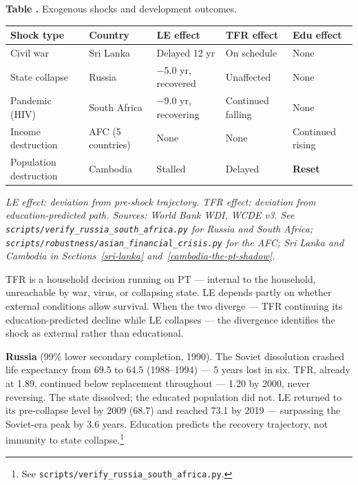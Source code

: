 \documentclass[12pt,letterpaper]{article}
\begin{document}
\label{tab:shock}\textbf{Table \thetable.} Exogenous shocks and development outcomes.

{\small
\begin{longtable}[]{@{}
  >{\raggedright\arraybackslash}p{}
  >{\raggedright\arraybackslash}p{}
  >{\raggedright\arraybackslash}p{}
  >{\raggedright\arraybackslash}p{}
  >{\raggedright\arraybackslash}p{}@{}}
\toprule
Shock type & Country & LE effect & TFR effect & Edu effect \\
\midrule
\endhead
Civil war & Sri Lanka & Delayed 12 yr & On schedule & None \\
State collapse & Russia & $-$5.0 yr, recovered & Unaffected & None \\
Pandemic (HIV) & South Africa & $-$9.0 yr, recovering & Continued falling & None \\
Income destruction & AFC (5 countries) & None & None & Continued rising \\
Population destruction & Cambodia & Stalled & Delayed & \textbf{Reset} \\
\bottomrule
\end{longtable}
}

\emph{LE effect: deviation from pre-shock trajectory. TFR effect:
deviation from education-predicted path. Sources: World Bank WDI, WCDE
v3. See \texttt{scripts/verify\_russia\_south\_africa.py} for Russia and
South Africa; \texttt{scripts/robustness/asian\_financial\_crisis.py} for the AFC;
Sri Lanka and Cambodia in Sections~\ref{sri-lanka}
and~\ref{cambodia-the-pt-shadow}.}

TFR is a household decision running on PT --- internal to the household,
unreachable by war, virus, or collapsing state. LE depends partly on
whether external conditions allow survival. When the two diverge --- TFR
continuing its education-predicted decline while LE collapses --- the
divergence identifies the shock as external rather than educational.

\textbf{Russia} (99\% lower secondary completion, 1990). The Soviet
dissolution crashed life expectancy from 69.5 to 64.5 (1988--1994) ---
5 years lost in six. TFR, already at 1.89, continued below replacement
throughout --- 1.20 by 2000, never reversing. The state dissolved; the
educated population did not. LE returned to its pre-collapse level by
2009 (68.7) and reached 73.1 by 2019 --- surpassing the Soviet-era peak
by 3.6 years. Education predicts the recovery trajectory, not immunity
to state collapse.\footnote{See
\texttt{scripts/verify\_russia\_south\_africa.py}.}
\end{document}
